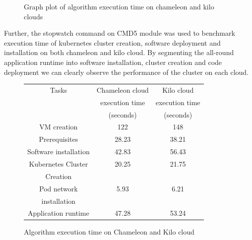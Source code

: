 \documentclass[9pt,twocolumn,twoside]{../../styles/osajnl}
\begin{document}
\begin{figure}[htbp]
\centering
{}
\caption{Graph plot of algorithm execution time on chameleon and kilo clouds}
\label{Graph plot of algorithm execution time on chameleon and kilo clouds}
\end{figure}

\noindent
Further, the stopwatch command on CMD5 module was used to benchmark
execution time of kubernetes cluster creation, software deployment and
installation on both chameleon and kilo cloud. By segmenting the
all-round application runtime into software installation, cluster
creation and code deployment we can clearly observe the performance of
the cluster on each cloud.


\begin{figure}[ht]
\begin{center}
 \begin{tabular}{|c | c| c|} 
 \hline
 Tasks  & Chameleon cloud & Kilo cloud \\
 & execution time & execution time \\
 & (seconds) & (seconds) \\ [0.5ex] 
 \hline\hline
    
VM creation & 122 & 148 \\
\hline

Prerequisites & 28.23 & 38.21 \\
\hline

Software installation & 42.83  & 56.43 \\[1ex]
\hline

Kubernetes Cluster & 20.25 & 21.75 \\
Creation & & \\[1ex]

\hline
Pod network & 5.93 & 6.21 \\
installation & & \\[1ex]

\hline
Application runtime & 47.28 & 53.24\\[1ex]
\hline

\end{tabular}
\end{center}
  \caption{Algorithm execution time on Chameleon and Kilo cloud}
\end{figure}
\end{document}
